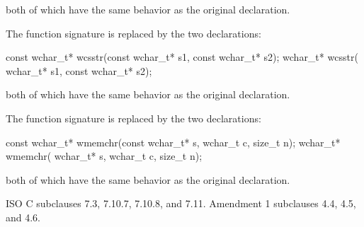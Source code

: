 \pnum
both of which have the same behavior as the original declaration.

\pnum
{}%
The function signature
is replaced by the two declarations:

\begin{codeblock}
const wchar_t* wcsstr(const wchar_t* s1, const wchar_t* s2);
      wchar_t* wcsstr(      wchar_t* s1, const wchar_t* s2);
\end{codeblock}

\pnum
both of which have the same behavior as the original declaration.

\pnum
{}%
The function signature
is replaced by the two declarations:

\begin{codeblock}
const wchar_t* wmemchr(const wchar_t* s, wchar_t c, size_t n);
      wchar_t* wmemchr(      wchar_t* s, wchar_t c, size_t n);
\end{codeblock}

\pnum
both of which have the same behavior as the original declaration.

\xref
ISO C subclauses 7.3, 7.10.7, 7.10.8, and  7.11.
Amendment 1 subclauses 4.4, 4.5, and 4.6.
